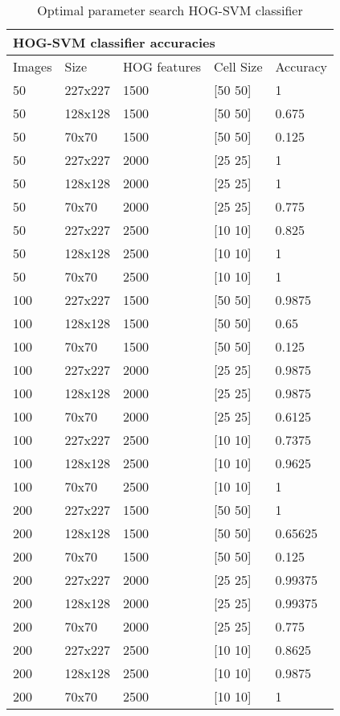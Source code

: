 \begin{table}[ht]
\centering
\begin{tabular}{|l|l|l|l|l|}
\hline
\multicolumn{5}{|l|}{HOG-SVM classifier accuracies} \\ \hline
Images  &  Size & HOG features & Cell Size & Accuracy \\ \hline
50 & 227x227 & 1500 & [50 50] & 1 \\ \hline
50 & 128x128 & 1500 & [50 50] & 0.675 \\ \hline
50 & 70x70 & 1500 & [50 50] & 0.125 \\ \hline
50 & 227x227 & 2000 & [25 25] & 1 \\ \hline
50 & 128x128 & 2000 & [25 25] & 1 \\ \hline
50 & 70x70 & 2000 & [25 25] & 0.775 \\ \hline
50 & 227x227 & 2500 & [10 10] & 0.825 \\ \hline
50 & 128x128 & 2500 & [10 10] & 1 \\ \hline
50 & 70x70 & 2500 & [10 10] & 1 \\ \hline
100 & 227x227 & 1500 & [50 50] & 0.9875 \\ \hline
100 & 128x128 & 1500 & [50 50] & 0.65 \\ \hline
100 & 70x70 & 1500 & [50 50] & 0.125 \\ \hline
100 & 227x227 & 2000 & [25 25] & 0.9875 \\ \hline
100 & 128x128 & 2000 & [25 25] & 0.9875 \\ \hline
100 & 70x70 & 2000 & [25 25] & 0.6125 \\ \hline
100 & 227x227 & 2500 & [10 10] & 0.7375 \\ \hline
100 & 128x128 & 2500 & [10 10] & 0.9625 \\ \hline
100 & 70x70 & 2500 & [10 10] & 1 \\ \hline
200 & 227x227 & 1500 & [50 50] & 1 \\ \hline
200 & 128x128 & 1500 & [50 50] & 0.65625 \\ \hline
200 & 70x70 & 1500 & [50 50] & 0.125 \\ \hline
200 & 227x227 & 2000 & [25 25] & 0.99375 \\ \hline
200 & 128x128 & 2000 & [25 25] & 0.99375 \\ \hline
200 & 70x70 & 2000 & [25 25] & 0.775 \\ \hline
200 & 227x227 & 2500 & [10 10] & 0.8625 \\ \hline
200 & 128x128 & 2500 & [10 10] & 0.9875 \\ \hline
200 & 70x70 & 2500 & [10 10] & 1 \\ \hline
\end{tabular}
\caption{Optimal parameter search HOG-SVM classifier}
\label{table:hog_stats}
\end{table}


